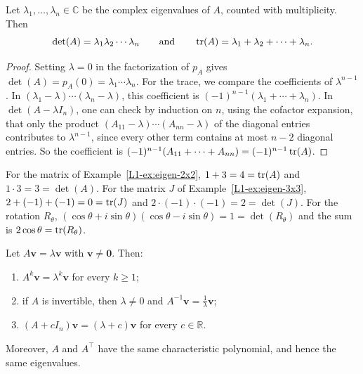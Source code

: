 \begin{theorem}\label{L1-thm:trace-det-eigen}
    Let $\lambda_1, \ldots, \lambda_n \in \mathbb{C}$ be the complex eigenvalues of $A$, counted with multiplicity. Then
    \[\det(A) = \lambda_1 \lambda_2 \cdots \lambda_n \qquad \text{and} \qquad \operatorname{tr}(A) = \lambda_1 + \lambda_2 + \cdots + \lambda_n.\]
\end{theorem}

\begin{proof}
    Setting $\lambda = 0$ in the factorization of $p_A$ gives $\det(A) = p_A(0) = \lambda_1 \cdots \lambda_n$. For the trace, we compare the coefficients of $\lambda^{n-1}$. In $(\lambda_1 - \lambda) \cdots (\lambda_n - \lambda)$, this coefficient is $(-1)^{n-1}(\lambda_1 + \cdots + \lambda_n)$. In $\det(A - \lambda I_n)$, one can check by induction on $n$, using the cofactor expansion, that only the product $(A_{11} - \lambda) \cdots (A_{nn} - \lambda)$ of the diagonal entries contributes to $\lambda^{n-1}$, since every other term contains at most $n - 2$ diagonal entries. So the coefficient is $(-1)^{n-1}(A_{11} + \cdots + A_{nn}) = (-1)^{n-1}\operatorname{tr}(A)$.
\end{proof}

\begin{example}
    For the matrix of Example~\ref{L1-ex:eigen-2x2}, $1 + 3 = 4 = \operatorname{tr}(A)$ and $1 \cdot 3 = 3 = \det(A)$. For the matrix $J$ of Example~\ref{L1-ex:eigen-3x3}, $2 + (-1) + (-1) = 0 = \operatorname{tr}(J)$ and $2 \cdot (-1) \cdot (-1) = 2 = \det(J)$. For the rotation $R_\theta$, $(\cos\theta + i\sin\theta)(\cos\theta - i\sin\theta) = 1 = \det(R_\theta)$ and the sum is $2\cos\theta = \operatorname{tr}(R_\theta)$.
\end{example}

\begin{proposition}\label{L1-prop:eigen-related}
    Let $A\mathbf{v} = \lambda \mathbf{v}$ with $\mathbf{v} \neq \mathbf{0}$. Then:
    \begin{enumerate}
        \item $A^k \mathbf{v} = \lambda^k \mathbf{v}$ for every $k \geq 1$;
        \item if $A$ is invertible, then $\lambda \neq 0$ and $A^{-1} \mathbf{v} = \frac{1}{\lambda} \mathbf{v}$;
        \item $(A + cI_n)\mathbf{v} = (\lambda + c)\mathbf{v}$ for every $c \in \mathbb{R}$.
    \end{enumerate}
    Moreover, $A$ and $A^\top$ have the same characteristic polynomial, and hence the same eigenvalues.
\end{proposition}

